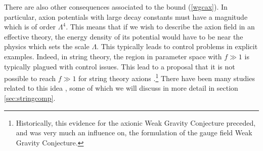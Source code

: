 \documentclass[11pt,a4paper]{article}
\numberwithin{equation}{section}
\numberwithin{table}{section}\setlength{\multlinegap}{25pt}
\begin{document}
There are also other consequences associated to the bound (\ref{wgcax}). In particular, axion potentials with large decay constants must have a magnitude which is of order $\Lambda^4$. This means that if we wish to describe the axion field in an effective theory, the energy density of its potential would have to be near the physics which sets the scale $\Lambda$. This typically leads to control problems in explicit examples. Indeed, in string theory, the region in parameter space with $f \gg 1$ is typically plagued with control issues. This lead to a proposal that it is not possible to reach $f \gg 1$ for string theory axions \cite{Banks:2003sx}.\footnote{Historically, this evidence for the axionic Weak Gravity Conjecture preceded, and was very much an influence on, the formulation of the gauge field Weak Gravity Conjecture.} There have been many studies related to this idea \cite{Svrcek:2006yi,Bachlechner:2014hsa,Long:2014dta,Long:2014fba,Bachlechner:2014gfa,Rudelius:2015xta,Montero:2015ofa,Bachlechner:2015qja,Shiu:2015uva,Ruehle:2015afa,Hebecker:2015rya,Brown:2015lia,Retolaza:2015sta,Peloso:2015dsa,Junghans:2015hba,Heidenreich:2015wga,Palti:2015xra,Bachlechner:2015cgq, Heidenreich:2015nta,Kooner:2015rza,Kappl:2015esy,Furuuchi:2015jfj,Choi:2015aem,Ibanez:2015fcv,Hebecker:2015zss,Conlon:2016aea,Retolaza:2016bpn,Heidenreich:2016jrl,Blumenhagen:2016bfp,Garcia-Valdecasas:2016voz,Heidenreich:2016aqi,Hebecker:2016dsw,Hebecker:2017wsu,Hebecker:2017uix,Montero:2017yja,Bachlechner:2017zpb,Bachlechner:2017hsj,Blumenhagen:2018hsh,Agrawal:2018mkd,Shiu:2018wzf,Hebecker:2018ofv,Hertog:2018kbz,Hebecker:2018yxs}, some of which we will discuss in more detail in section \ref{sec:stringcomp}.
\end{document}
